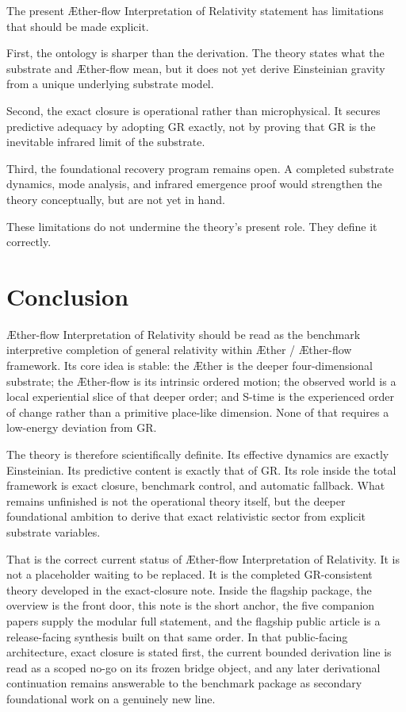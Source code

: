\documentclass[11pt]{article}
\newcommand{\Aether}{\AE{}ther}
\newcommand{\Aflow}{\AE{}ther-flow}
\newcommand{\TheoryName}{\Aflow{} Interpretation of Relativity}
\newcommand{\TheoryProgram}{\Aether{} / \Aflow{} framework}
\begin{document}
The present \TheoryName{} statement has limitations that should be made explicit.

First, the ontology is sharper than the derivation. The theory states what the substrate and \Aflow{} mean, but it does not yet derive Einsteinian gravity from a unique underlying substrate model.

Second, the exact closure is operational rather than microphysical. It secures predictive adequacy by adopting GR exactly, not by proving that GR is the inevitable infrared limit of the substrate.

Third, the foundational recovery program remains open. A completed substrate dynamics, mode analysis, and infrared emergence proof would strengthen the theory conceptually, but are not yet in hand.

These limitations do not undermine the theory's present role. They define it correctly.

\section{Conclusion}

\TheoryName{} should be read as the benchmark interpretive completion of general relativity within \TheoryProgram{}. Its core idea is stable: the \Aether{} is the deeper four-dimensional substrate; the \Aflow{} is its intrinsic ordered motion; the observed world is a local experiential slice of that deeper order; and S-time is the experienced order of change rather than a primitive place-like dimension. None of that requires a low-energy deviation from GR.

The theory is therefore scientifically definite. Its effective dynamics are exactly Einsteinian. Its predictive content is exactly that of GR. Its role inside the total framework is exact closure, benchmark control, and automatic fallback. What remains unfinished is not the operational theory itself, but the deeper foundational ambition to derive that exact relativistic sector from explicit substrate variables.

That is the correct current status of \TheoryName{}. It is not a placeholder waiting to be replaced. It is the completed GR-consistent theory developed in the exact-closure note. Inside the flagship package, the overview is the front door, this note is the short anchor, the five companion papers supply the modular full statement, and the flagship public article is a release-facing synthesis built on that same order. In that public-facing architecture, exact closure is stated first, the current bounded derivation line is read as a scoped no-go on its frozen bridge object, and any later derivational continuation remains answerable to the benchmark package as secondary foundational work on a genuinely new line.


\end{document}
